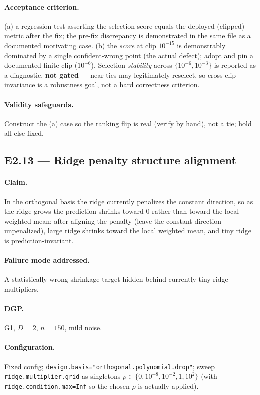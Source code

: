\documentclass[11pt]{article}
\newcommand{\code}[1]{\texttt{#1}}
\begin{document}
\paragraph{Acceptance criterion.} (a) a regression test asserting the selection score equals the
deployed (clipped) metric after the fix; the pre-fix discrepancy is demonstrated in the same
file as a documented motivating case. (b) the \emph{score} at clip $10^{-15}$ is demonstrably
dominated by a single confident-wrong point (the actual defect); adopt and pin a documented
finite clip ($10^{-6}$). Selection \emph{stability} across $\{10^{-6},10^{-3}\}$ is reported as a
diagnostic, \textbf{not gated} --- near-ties may legitimately reselect, so cross-clip invariance
is a robustness goal, not a hard correctness criterion.

\paragraph{Validity safeguards.} Construct the (a) case so the ranking flip is real (verify by
hand), not a tie; hold all else fixed.

\subsection{E2.13 — Ridge penalty structure alignment}

\paragraph{Claim.} In the orthogonal basis the ridge currently penalizes the constant direction,
so as the ridge grows the prediction shrinks toward $0$ rather than toward the local weighted
mean; after aligning the penalty (leave the constant direction unpenalized), large ridge shrinks
toward the local weighted mean, and tiny ridge is prediction-invariant.

\paragraph{Failure mode addressed.} A statistically wrong shrinkage target hidden behind
currently-tiny ridge multipliers.

\paragraph{DGP.} G1, $D=2$, $n=150$, mild noise.

\paragraph{Configuration.} Fixed config; \code{design.basis="orthogonal.polynomial.drop"};
sweep \code{ridge.multiplier.grid} as singletons $\rho\in\{0,10^{-8},10^{-2},1,10^2\}$ (with
\code{ridge.condition.max=Inf} so the chosen $\rho$ is actually applied).
\end{document}
